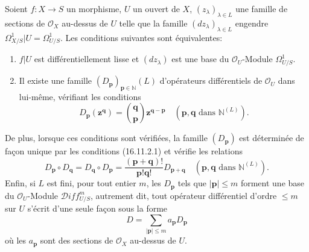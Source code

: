 \begin{theorem}[16.11.2]
\label{IV.16.11.2}
Soient $f:X\to S$ un morphisme, $U$ un ouvert de $X$,
$(z_\lambda)_{\lambda\in L}$ une famille de sections de $\mathcal{O}_X$
au-dessus de $U$ telle que la famille $(dz_\lambda)_{\lambda\in L}$ engendre
$\varOmega_{X/S}^1|U=\varOmega_{U/S}^1$. Les conditions suivantes sont
équivalentes:
\begin{enumerate}
  \item[\textup{a)}] $f|U$ est différentiellement lisse et $(dz_\lambda)$ est une base
  du $\mathcal{O}_U$-Module $\varOmega_{U/S}^1$.
  \item[\textup{b)}] Il existe une famille
  $(D_{\mathbf{p}})_{\mathbf{p}\in\mathbb{N}}(L)$ d'opérateurs
  différentiels de $\mathcal{O}_U$ dans lui-même, vérifiant les conditions
  \[
    D_{\mathbf{p}}(\mathbf{z}^{\mathbf{q}})
    =\binom{\mathbf{q}}{\mathbf{p}}
      \mathbf{z}^{\mathbf{q}-\mathbf{p}}
    \quad(\mathbf{p},\mathbf{q}\text{ dans }\mathbb{N}^{(L)}).
    \tag{16.11.2.1}
    \label{IV.16.11.2.1}
  \]
\end{enumerate}

De plus, lorsque ces conditions sont vérifiées, la famille
$(D_{\mathbf{p}})$ est déterminée de façon unique par les conditions
\textup{(16.11.2.1)} et vérifie les relations
\[
  D_{\mathbf{p}}\circ D_{\mathbf{q}}
  =D_{\mathbf{q}}\circ D_{\mathbf{p}}
  =\frac{(\mathbf{p}+\mathbf{q})!}{\mathbf{p}!\mathbf{q}!}
    D_{\mathbf{p}+\mathbf{q}}
  \quad(\mathbf{p},\mathbf{q}\text{ dans }\mathbb{N}^{(L)}).
  \tag{16.11.2.2}
  \label{IV.16.11.2.2}
\]
Enfin, si $L$ est fini, pour tout entier $m$, les $D_{\mathbf{p}}$ tels que
$|\mathbf{p}|\leq m$ forment une base du $\mathcal{O}_U$-Module
$\mathscr{D}\!iff_{U/S}^m$, autrement dit, tout opérateur différentiel
d'ordre $\leq m$ sur $U$ s'écrit d'une seule façon sous la forme
\[
  D=\sum_{|\mathbf{p}|\leq m}a_{\mathbf{p}}D_{\mathbf{p}}
\]
où les $a_{\mathbf{p}}$ sont des sections de $\mathcal{O}_X$ au-dessus de
$U$.
\end{theorem}

